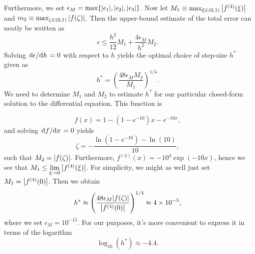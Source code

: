 \documentclass[english,notitlepage]{revtex4-1}  %
\begin{document}
Furthermore, we set $\epsilon_M = \max\{\abs{\epsilon_1}, \abs{\epsilon_2}, \abs{\epsilon_3}\}$. Now let $M_1 \equiv \max_{\xi \in (0,1)}\abs{f^{(4)}(\xi)}$ and 
$m_2 \equiv \max_{\zeta \in (0,1)}\abs{f(\zeta)}$. Then the upper-bound estimate of the total error can neatly be written as
\begin{equation}
	\epsilon \leq \frac{h^2}{12}M_1 + \frac{4\epsilon_M}{h^2}M_2.
\end{equation}
Solving $\dv*{\epsilon}{h} = 0$ with respect to $h$ yields the optimal choice of step-size $h^*$ given as  
\begin{equation}\label{optimal_stepsize}
	h^* = \left(\frac{48\epsilon_M M_2}{M_1}\right)^{1/4}.
\end{equation}
We need to determine $M_1$ and $M_2$ to estimate $h^*$ for our particular closed-form solution to the differential equation. This function is 

\begin{equation}
	f(x) = 1-(1-e^{-10})x - e^{-10x},
\end{equation}
and solving $\dv*{f}{x} = 0$ yields 
\begin{equation}
	\zeta = -\frac{\ln(1-e^{-10}) - \ln(10)}{10},
\end{equation}
such that $M_2 = \abs{f(\zeta)}$.
Furthermore, $f^{(4)}(x) = -10^4\exp(-10x)$, hence we see that $M_1 \leq \lim\limits_{\xi \to 0}\abs{f^{(4)}(\xi)}$. For simplicity, we might as well just set $M_1 = \abs{f^{(4)}(0)}$. Then we obtain 
\begin{equation}
	h^* \approx \left(\frac{48\epsilon_M \abs{f(\zeta)}}{\abs{f^{(4)}(0)}}\right)^{1/4} \approx 4\times 10^{-5},
\end{equation}
where we set $\epsilon_M = 10^{-15}$. For our purposes, it's more convenient to express it in terms of the logarithm
\begin{equation}
	\log_{10}(h^*) \approx -4.4.
\end{equation}
\end{document}
